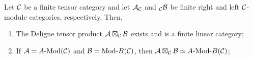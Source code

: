 \documentclass{amsart}
\begin{document}
\begin{theorem} \label{thm:DelignePrdtOverATCExists}
	Let $\mathcal C$ be a finite tensor category and let $\mathcal A_{\mathcal C}$ and ${}_{\mathcal C}\mathcal B$ be finite right and left $\mathcal C$-module categories, respectively. Then,
	\begin{enumerate}
		\item The Deligne tensor product $\mathcal A \boxtimes_{\mathcal C} \mathcal B$ exists and is a finite linear category;
		\item If $\cA = \Mod{A}{}(\cC)$ and $\cB = \Mod{}{B}(\cC)$, then $\cA \boxtimes_{\cC} \cB \simeq \Mod{A }{B}(\cC)$;
	\end{enumerate} 
\end{theorem}
\end{document}
